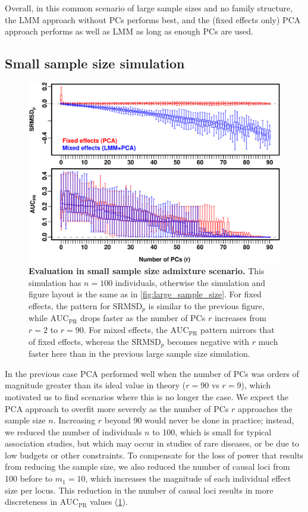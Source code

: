 \documentclass[11pt]{article}
\newcommand{\rmsd}{\text{SRMSD}_p}
\newcommand{\auc}{\text{AUC}_\text{PR}}
\begin{document}
Overall, in this common scenario of large sample sizes and no family structure, the LMM approach without PCs performs best, and the (fixed effects only) PCA approach performs as well as LMM as long as enough PCs are used.

\subsection{Small sample size simulation}

\begin{figure}[bp!]
  \centering
  \includegraphics[width=6in]{../data/sim-n100-k10-f0.1-s0.5-g1/sum-rmsd-auc.pdf}
  \caption{
    {\bf Evaluation in small sample size admixture scenario.}
    This simulation has $n = 100$ individuals, otherwise the simulation and figure layout is the same as in \cref{fig:large_sample_size}.
    For fixed effects, the pattern for $\rmsd$ is similar to the previous figure, while $\auc$ drops faster as the number of PCs $r$ increases from $r=2$ to $r=90$.
    For mixed effects, the $\auc$ pattern mirrors that of fixed effects, whereas the $\rmsd$ becomes negative with $r$ much faster here than in the previous large sample size simulation.
  }
  \label{fig:small_sample_size}
\end{figure}

In the previous case PCA performed well when the number of PCs was orders of magnitude greater than its ideal value in theory ($r = 90$ vs $r = 9$), which motivated us to find scenarios where this is no longer the case.
We expect the PCA approach to overfit more severely as the number of PCs $r$ approaches the sample size $n$.
Increasing $r$ beyond 90 would never be done in practice; 
instead, we reduced the number of individuals $n$ to 100, which is small for typical association studies, but which may occur in studies of rare diseases, or be due to low budgets or other constraints.
To compensate for the loss of power that results from reducing the sample size, we also reduced the number of causal loci from 100 before to $m_1 = 10$, which increases the magnitude of each individual effect size per locus.
This reduction in the number of causal loci results in more discreteness in $\auc$ values (\cref{fig:small_sample_size}).
\end{document}
